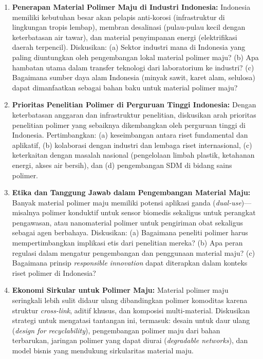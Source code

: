 \documentclass[12pt,a4paper,openany]{book}
\begin{document}
\begin{enumerate}

\item \textbf{Penerapan Material Polimer Maju di Industri Indonesia:} Indonesia memiliki kebutuhan besar akan pelapis anti-korosi (infrastruktur di lingkungan tropis lembap), membran desalinasi (pulau-pulau kecil dengan keterbatasan air tawar), dan material penyimpanan energi (elektrifikasi daerah terpencil). Diskusikan: (a) Sektor industri mana di Indonesia yang paling diuntungkan oleh pengembangan lokal material polimer maju? (b) Apa hambatan utama dalam transfer teknologi dari laboratorium ke industri? (c) Bagaimana sumber daya alam Indonesia (minyak sawit, karet alam, selulosa) dapat dimanfaatkan sebagai bahan baku untuk material polimer maju?

\item \textbf{Prioritas Penelitian Polimer di Perguruan Tinggi Indonesia:} Dengan keterbatasan anggaran dan infrastruktur penelitian, diskusikan arah prioritas penelitian polimer yang sebaiknya dikembangkan oleh perguruan tinggi di Indonesia. Pertimbangkan: (a) keseimbangan antara riset fundamental dan aplikatif, (b) kolaborasi dengan industri dan lembaga riset internasional, (c) keterkaitan dengan masalah nasional (pengelolaan limbah plastik, ketahanan energi, akses air bersih), dan (d) pengembangan SDM di bidang sains polimer.

\item \textbf{Etika dan Tanggung Jawab dalam Pengembangan Material Maju:} Banyak material polimer maju memiliki potensi aplikasi ganda (\textit{dual-use})---misalnya polimer konduktif untuk sensor biomedis sekaligus untuk perangkat pengawasan, atau nanomaterial polimer untuk pengiriman obat sekaligus sebagai agen berbahaya. Diskusikan: (a) Bagaimana peneliti polimer harus mempertimbangkan implikasi etis dari penelitian mereka? (b) Apa peran regulasi dalam mengatur pengembangan dan penggunaan material maju? (c) Bagaimana prinsip \textit{responsible innovation} dapat diterapkan dalam konteks riset polimer di Indonesia?

\item \textbf{Ekonomi Sirkular untuk Polimer Maju:} Material polimer maju seringkali lebih sulit didaur ulang dibandingkan polimer komoditas karena struktur \textit{cross-link}, aditif khusus, dan komposisi multi-material. Diskusikan strategi untuk mengatasi tantangan ini, termasuk: desain untuk daur ulang (\textit{design for recyclability}), pengembangan polimer maju dari bahan terbarukan, jaringan polimer yang dapat diurai (\textit{degradable networks}), dan model bisnis yang mendukung sirkularitas material maju.

\end{enumerate}
\end{document}
